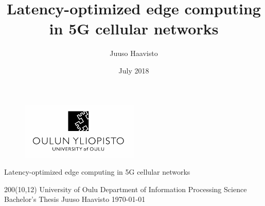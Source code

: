 \documentclass[12pt]{article}
\title{Latency-optimized edge computing in \gls{5G} cellular networks}
\author{Juuso Haavisto}
\date{July 2018}
\begin{document}
\renewcommand{\rmdefault}{phv} %
\renewcommand{\familydefault}{\rmdefault}

\begin{titlepage}


    \begin{figure}
      \centering
        \includegraphics[width=0.5\textwidth]{assets/univ.png}
    \end{figure}
    
    
    \begin{center}
        \selectfont
        \huge{Latency-optimized edge computing in \gls{5G} cellular networks}
    \end{center}
    
    \begin{textblock}{200}(10,12)%
    \obeylines
    \setlength{\parskip}{0cm}
        University of Oulu
        Department of Information Processing
        Science
        Bachelor's Thesis
        Juuso Haavisto
        \today
    \end{textblock}%
    
\end{titlepage}

\newpage
\end{document}
